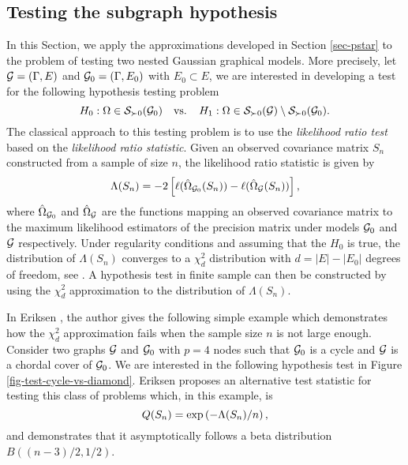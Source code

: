 \subsection{Testing the subgraph hypothesis} \label{sec-hyp-test}


In this Section, we apply the approximations developed in Section \ref{sec-pstar} to the problem of testing two nested Gaussian graphical models. More precisely, let ${\mathcal{G}} = (\Gamma, E)$ and ${\mathcal{G}}_0 = (\Gamma, E_0)$ with $E_0 \subset E$, we are interested in developing a test for the following hypothesis testing problem
\begin{equation} \label{eq-null-general-graph}
    H_0 : \Omega \in {\mathcal{S}}_{\succ 0}({\mathcal{G}}_0)\ \ {\textrm{ vs. }}\ \ H_1 : \Omega \in {\mathcal{S}}_{\succ 0}({\mathcal{G}}) \setminus {\mathcal{S}}_{\succ 0}({\mathcal{G}}_0).
\end{equation}
The classical approach to this testing  problem is to use the \textit{likelihood ratio test} based on the \textit{likelihood ratio statistic}. Given an observed covariance matrix $S_n$ constructed from a sample of size $n$, the likelihood ratio statistic is given by
\begin{equation*}
    \Lambda(S_n) = -2 \left[\ell(\hat\Omega_{{\mathcal{G}}_0}(S_n)) - \ell(\hat\Omega_{\mathcal{G}}(S_n))\right],
\end{equation*}
where $\hat\Omega_{{\mathcal{G}}_0}$ and $\hat\Omega_{\mathcal{G}}$ are the functions mapping an observed covariance matrix to the maximum likelihood estimators of the precision matrix under models ${\mathcal{G}}_0$ and ${\mathcal{G}}$ respectively. Under regularity conditions and assuming that the $H_0$ is true, the distribution of $\Lambda(S_n)$ converges to a $\chi^2_d$ distribution with $d = |E| - |E_0|$ degrees of freedom, see \cite{wilks1938large}. A hypothesis test in finite sample can then be constructed by using the $\chi^2_d$ approximation to the distribution of $\Lambda(S_n)$.

In Eriksen \cite{eriksen1996tests}, the author gives the following simple example which demonstrates how the $\chi^2_d$ approximation fails when the sample size $n$ is not large enough. Consider two graphs ${\mathcal{G}}$ and ${\mathcal{G}}_0$ with $p = 4$ nodes such that ${\mathcal{G}}_0$ is a cycle and ${\mathcal{G}}$ is a chordal cover of ${\mathcal{G}}_0$. We are interested in the following hypothesis test in Figure \ref{fig-test-cycle-vs-diamond}. Eriksen proposes an alternative test statistic for testing this class of problems which, in this example, is
\begin{equation} \label{eq-q-stat}
    Q(S_n) = \exp\left(-\Lambda(S_n) / n\right),
\end{equation}
and demonstrates that it asymptotically follows a beta distribution $B((n - 3)/2, 1/2)$.



